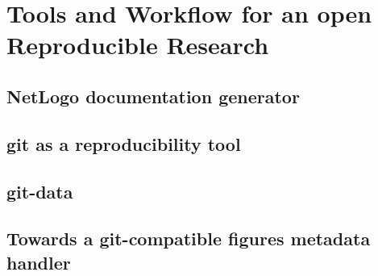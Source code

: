 



\chapter{Tools and Workflow for an open Reproducible Research} %

\label{app:workflow} %





%
%
%






\section{NetLogo documentation generator}






\section{git as a reproducibility tool}





\section{git-data}




\section{Towards a git-compatible figures metadata handler}

